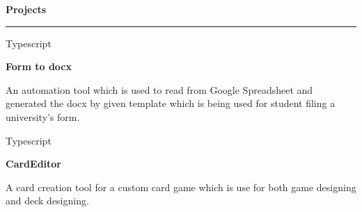 \documentclass[10pt]{article}
\begin{document}
    \noindent
    \begin{minipage}{\textwidth}
        \large\textbf{Projects}\par
        \vspace{0.25em}
        \nointerlineskip
        \noindent
        \rule{0.25\textwidth}{0.4pt}
        \par

        \vspace{0.45em}

        \begin{minipage}{0.85\textwidth}
            \normalsize
            \begingroup
                Typescript\par
                \textbf{Form to docx}\par
            \endgroup
        \end{minipage}
        \hfill
        \begin{minipage}{0.04\textwidth}
            \normalsize
            \endgroup
        \end{minipage}

        \vspace{0.35em}
        \begin{minipage}{0.993\textwidth}
            \normalsize
            \begingroup
            An automation tool which is used to read from Google Spreadsheet and generated the docx by given template which is being used for student filing a university's form.
            \endgroup
        \end{minipage}

        \vspace{0.85em}

        \begin{minipage}{0.85\textwidth}
            \normalsize
            \begingroup
                Typescript\par
                \textbf{CardEditor}\par
            \endgroup
        \end{minipage}
        \hfill
        \begin{minipage}{0.04\textwidth}
            \normalsize
            \endgroup
        \end{minipage}

        \vspace{0.35em}
        \begin{minipage}{0.993\textwidth}
            \normalsize
            \begingroup
            A card creation tool for a custom card game which is use for both game designing and deck designing.
            \endgroup
        \end{minipage}


\end{minipage}
\end{document}
